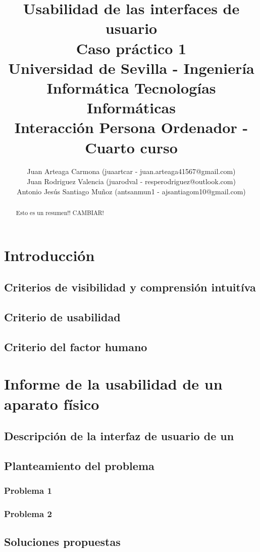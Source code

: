 \documentclass[a4paper,11pt]{article}
\title{
        \textbf{Usabilidad de las interfaces de usuario}\large\\
        \textbf{Caso práctico 1}\\
        \medskip
        Universidad de Sevilla - Ingeniería Informática Tecnologías Informáticas\\
        Interacción Persona Ordenador - Cuarto curso}
\author{Juan Arteaga Carmona (juaartcar - juan.arteaga41567@gmail.com)\\
        Juan Rodriguez Valencia (juarodval - resperodriguez@outlook.com)\\
        Antonio Jesús Santiago Muñoz (antsanmun1 - ajsantiagom10@gmail.com)\\
}
\begin{document}
\maketitle

\begin{abstract}
    Esto es un resumen!! CAMBIAR!
\end{abstract}

\newpage
\tableofcontents
\listoffigures
\renewcommand{\listtablename}{Índice de tablas} %
\listoftables
\newpage

\section{Introducción}
\subsection{Criterios de visibilidad y comprensión intuitíva}
\subsection{Criterio de usabilidad}
\subsection{Criterio del factor humano}


\section{Informe de la usabilidad de un aparato físico}
\subsection{Descripción de la interfaz de usuario de un }
\subsection{Planteamiento del problema}
\subsubsection{Problema 1}
\subsubsection{Problema 2}


\subsection{Soluciones propuestas}
\end{document}
